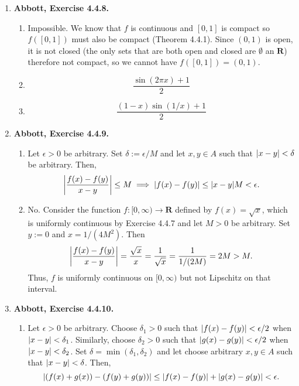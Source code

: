 \documentclass{article}
\DeclarePairedDelimiter\abs{\lvert}{\rvert}
\newcommand{\R}{\mathbf{R}}
\newcommand{\exc}[2][Abbott]{\item \textbf{#1, Exercise #2.}}
\newcommand{\lep}[1][L]{#1et $\epsilon > 0$ be arbitrary}
\let\oldsin\sin
\renewcommand{\sin}[1]{\oldsin \left( #1 \right)}
\begin{document}
\begin{enumerate}
    \exc{4.4.8}
    \begin{enumerate}
        \item Impossible. We know that $f$ is continuous and $[0, 1]$ is compact so $f([0, 1])$ must also be compact (Theorem 4.4.1). Since $(0, 1)$ is open, it is not closed (the only sets that are both open and closed are $\emptyset$ an $\R$) therefore not compact, so we cannot have $f([0, 1]) = (0, 1)$.
        
        \item \begin{equation*}
            \frac{\sin{2 \pi x} + 1}{2}
        \end{equation*}
        
        \item \begin{equation*}
            \frac{(1-x) \sin{1/x}+1}{2}
        \end{equation*}
    \end{enumerate}
    
    \exc{4.4.9}
    \begin{enumerate}
        \item \lep. Set $\delta := \epsilon/M$ and let $x,y \in A$ such that $\abs{x-y} < \delta$ be arbitrary. Then, 
        \begin{equation*}
            \abs*{\frac{f(x)-f(y)}{x-y}} \leq M \implies
            \abs{f(x)-f(y)} \leq \abs{x-y} M < \epsilon.
        \end{equation*}
        
        \item No. Consider the function $f : [0, \infty) \to \R$ defined by $f(x)=\sqrt{x}$, which is uniformly continuous by Exercise 4.4.7 and let $M > 0$ be arbitrary. Set $y := 0$ and $x = 1/(4M^2)$. Then 
        \begin{equation*}
            \abs*{\frac{f(x)-f(y)}{x-y}} = \frac{\sqrt{x}}{x} = 
            \frac{1}{\sqrt{x}} = \frac{1}{1/(2M)} = 2M > M. 
        \end{equation*} Thus, $f$ is uniformly continuous on $[0, \infty)$ but not Lipschitz on that interval.
    \end{enumerate}
    
    \exc{4.4.10}
    \begin{enumerate}
        \item \lep. Choose $\delta_1 > 0$ such that $\abs{f(x)-f(y)} < \epsilon/2$ when $\abs{x-y} < \delta_1$. Similarly, choose $\delta_2 > 0$ such that $\abs{g(x)-g(y)} < \epsilon/2$ when $\abs{x-y} < \delta_2$. Set $\delta = \min(\delta_1, \delta_2)$ and let choose arbitrary $x,y \in A$ such that $\abs{x-y} < \delta$. Then,
        \begin{equation*}
            \abs{(f(x)+g(x)) - (f(y)+g(y))} \leq \abs{f(x)-f(y)} + \abs{g(x)-g(y)}
            < \epsilon.
        \end{equation*}
        

\end{enumerate}
\end{enumerate}
\end{document}
